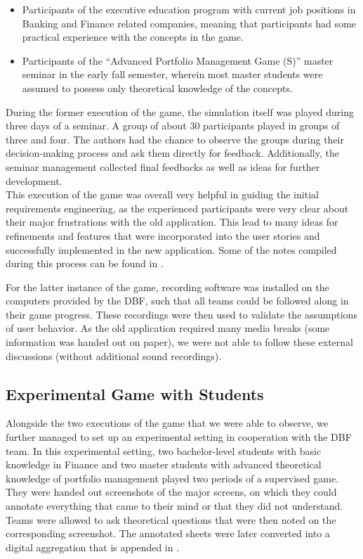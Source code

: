 \begin{itemize}
  \item Participants of the executive education program with current job positions in Banking and Finance related companies, meaning that participants had some practical experience with the concepts in the game.
  \item Participants of the ``Advanced Portfolio Management Game (S)'' master seminar in the early fall semester, wherein most master students were assumed to possess only theoretical knowledge of the concepts.
\end{itemize}

During the former execution of the game, the simulation itself was played during three days of a seminar. A group of about 30 participants played in groups of three and four. The authors had the chance to observe the groups during their decision-making process and ask them directly for feedback. Additionally, the seminar management collected final feedbacks as well as ideas for further development.\\

This execution of the game was overall very helpful in guiding the initial requirements engineering, as the experienced participants were very clear about their major frustrations with the old application. This lead to many ideas for refinements and features that were incorporated into the user stories and successfully implemented in the new application. Some of the notes compiled during this process can be found in .

For the latter instance of the game, recording software was installed on the computers provided by the DBF, such that all teams could be followed along in their game progress. These recordings were then used to validate the assumptions of user behavior. As the old application required many media breaks (some information was handed out on paper), we were not able to follow these external discussions (without additional sound recordings).


\subsection{Experimental Game with Students}
Alongside the two executions of the game that we were able to observe, we further managed to set up an experimental setting in cooperation with the DBF team. In this experimental setting, two bachelor-level students with basic knowledge in Finance and two master students with advanced theoretical knowledge of portfolio management played two periods of a supervised game. They were handed out screenshots of the major screens, on which they could annotate everything that came to their mind or that they did not understand. Teams were allowed to ask theoretical questions that were then noted on the corresponding screenshot. The annotated sheets were later converted into a digital aggregation that is appended in . \\

